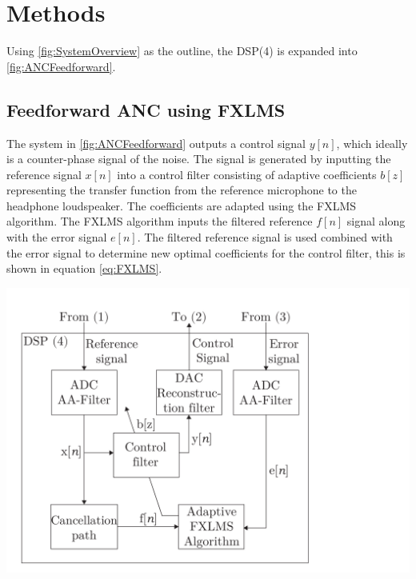 \section{Methods}

Using \autoref{fig:SystemOverview} as the outline, the DSP(4) is expanded into \autoref{fig:ANCFeedforward}.




\subsection{Feedforward ANC using FXLMS}


The system in \autoref{fig:ANCFeedforward} outputs a control signal $y[n]$, which ideally is a counter-phase signal of the noise. The signal is generated by inputting the reference signal $x[n]$ into a control filter consisting of adaptive coefficients $b[z]$ representing the transfer function from the reference microphone to the headphone loudspeaker. The coefficients are adapted using the FXLMS algorithm. The FXLMS algorithm inputs the filtered reference $f[n]$ signal along with the error signal $e[n]$. The filtered reference signal is used combined with the error signal to determine new optimal coefficients for the control filter, this is shown in equation \ref{eq:FXLMS}.

 
{
	\includegraphics[width=1\columnwidth]{figures/ArticleIllustrations/ANCFeedForward}
	\label{fig:ANCFeedforward}
}

